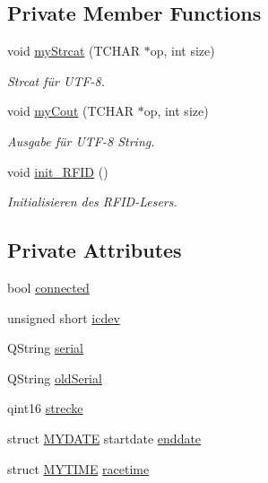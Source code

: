 \subsection*{Private Member Functions}
\begin{CompactItemize}
\item 
void \hyperlink{class_r_f_i_d___c_r500_04bf682d670036b022d674c96a855140}{myStrcat} (TCHAR $\ast$op, int size)
\begin{CompactList}\small\item\em Strcat für UTF-8. \item\end{CompactList}\item 
void \hyperlink{class_r_f_i_d___c_r500_45353483301fecf71b2c2d0c386e30e2}{myCout} (TCHAR $\ast$op, int size)
\begin{CompactList}\small\item\em Ausgabe für UTF-8 String. \item\end{CompactList}\item 
void \hyperlink{class_r_f_i_d___c_r500_ce1fec5794623260b5e697762899bc73}{init\_\-RFID} ()
\begin{CompactList}\small\item\em Initialisieren des RFID-Lesers. \item\end{CompactList}\end{CompactItemize}
\subsection*{Private Attributes}
\begin{CompactItemize}
\item 
bool \hyperlink{class_r_f_i_d___c_r500_40862a8ca6eeaf91bb5974f17641285a}{connected}
\item 
unsigned short \hyperlink{class_r_f_i_d___c_r500_db93e027f9415df3008e43478a9bdaed}{icdev}
\item 
QString \hyperlink{class_r_f_i_d___c_r500_80434957a623b58350ddd0b0eea45133}{serial}
\item 
QString \hyperlink{class_r_f_i_d___c_r500_92b6e6199e3e40cdeddceafe64707af9}{oldSerial}
\item 
qint16 \hyperlink{class_r_f_i_d___c_r500_2fa7bc6f3433a1acf060356166d591a6}{strecke}
\item 
struct \hyperlink{struct_m_y_d_a_t_e}{MYDATE} startdate \hyperlink{class_r_f_i_d___c_r500_a833f1ef40098bd9f9d07787bfe45271}{enddate}
\item 
struct \hyperlink{struct_m_y_t_i_m_e}{MYTIME} \hyperlink{class_r_f_i_d___c_r500_1790d6c17d8367723c96ad74515bd709}{racetime}
\end{CompactItemize}

